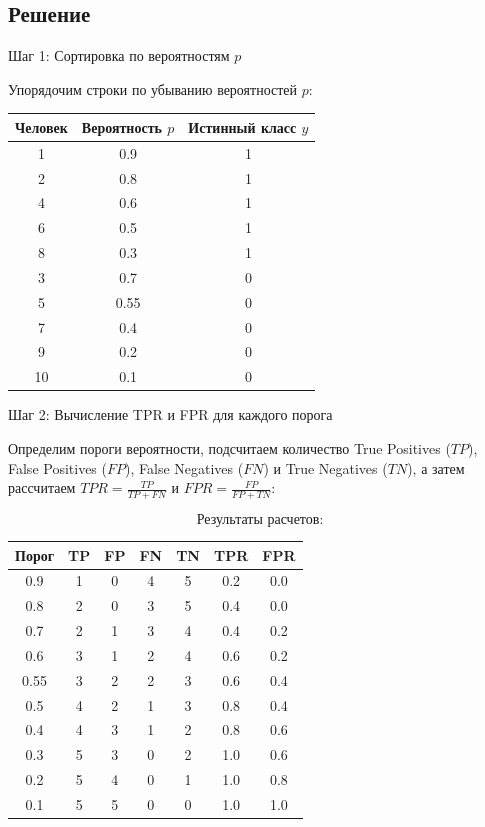 \subsection*{Решение}

Шаг 1: Сортировка по вероятностям $p$

Упорядочим строки по убыванию вероятностей $p$:

\begin{table}[h!]
\centering
\begin{tabular}{|c|c|c|}
\hline
\textbf{Человек} & \textbf{Вероятность $p$} & \textbf{Истинный класс $y$} \\
\hline
1 & 0.9 & 1 \\
2 & 0.8 & 1 \\
4 & 0.6 & 1 \\
6 & 0.5 & 1 \\
8 & 0.3 & 1 \\
3 & 0.7 & 0 \\
5 & 0.55 & 0 \\
7 & 0.4 & 0 \\
9 & 0.2 & 0 \\
10 & 0.1 & 0 \\
\hline
\end{tabular}
\end{table}

Шаг 2: Вычисление TPR и FPR для каждого порога

Определим пороги вероятности, подсчитаем количество True Positives ($TP$), False Positives ($FP$), False Negatives ($FN$) и True Negatives ($TN$), а затем рассчитаем $TPR = \frac{TP}{TP + FN}$ и $FPR = \frac{FP}{FP + TN}$:

\[
\text{Результаты расчетов:}
\]

\begin{table}[h!]
\centering
\begin{tabular}{|c|c|c|c|c|c|c|}
\hline
\textbf{Порог} & \textbf{TP} & \textbf{FP} & \textbf{FN} & \textbf{TN} & \textbf{TPR} & \textbf{FPR} \\
\hline
0.9 & 1 & 0 & 4 & 5 & 0.2 & 0.0 \\
0.8 & 2 & 0 & 3 & 5 & 0.4 & 0.0 \\
0.7 & 2 & 1 & 3 & 4 & 0.4 & 0.2 \\
0.6 & 3 & 1 & 2 & 4 & 0.6 & 0.2 \\
0.55 & 3 & 2 & 2 & 3 & 0.6 & 0.4 \\
0.5 & 4 & 2 & 1 & 3 & 0.8 & 0.4 \\
0.4 & 4 & 3 & 1 & 2 & 0.8 & 0.6 \\
0.3 & 5 & 3 & 0 & 2 & 1.0 & 0.6 \\
0.2 & 5 & 4 & 0 & 1 & 1.0 & 0.8 \\
0.1 & 5 & 5 & 0 & 0 & 1.0 & 1.0 \\
\hline
\end{tabular}
\end{table}



